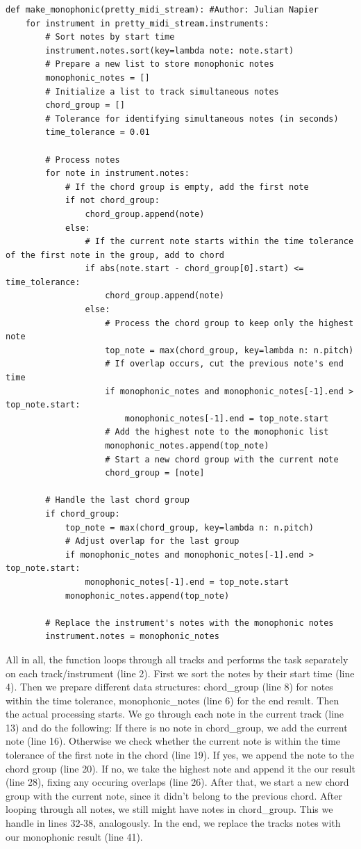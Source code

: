 \documentclass[a4paper,12pt]{extarticle}
\begin{document}
\begin{lstlisting}
def make_monophonic(pretty_midi_stream): #Author: Julian Napier
    for instrument in pretty_midi_stream.instruments:
        # Sort notes by start time
        instrument.notes.sort(key=lambda note: note.start)
        # Prepare a new list to store monophonic notes
        monophonic_notes = []
        # Initialize a list to track simultaneous notes
        chord_group = []
        # Tolerance for identifying simultaneous notes (in seconds)
        time_tolerance = 0.01

        # Process notes
        for note in instrument.notes:
            # If the chord group is empty, add the first note
            if not chord_group:
                chord_group.append(note)
            else:
                # If the current note starts within the time tolerance of the first note in the group, add to chord
                if abs(note.start - chord_group[0].start) <= time_tolerance:
                    chord_group.append(note)
                else:
                    # Process the chord group to keep only the highest note
                    top_note = max(chord_group, key=lambda n: n.pitch)
                    # If overlap occurs, cut the previous note's end time
                    if monophonic_notes and monophonic_notes[-1].end > top_note.start:
                        monophonic_notes[-1].end = top_note.start
                    # Add the highest note to the monophonic list
                    monophonic_notes.append(top_note)
                    # Start a new chord group with the current note
                    chord_group = [note]

        # Handle the last chord group
        if chord_group:
            top_note = max(chord_group, key=lambda n: n.pitch)
            # Adjust overlap for the last group
            if monophonic_notes and monophonic_notes[-1].end > top_note.start:
                monophonic_notes[-1].end = top_note.start
            monophonic_notes.append(top_note)

        # Replace the instrument's notes with the monophonic notes
        instrument.notes = monophonic_notes
\end{lstlisting}
All in all, the function loops through all tracks and performs the task separately on each track/instrument (line 2). First we sort the notes by their start time (line 4). Then we prepare different data structures: chord\_group (line 8) for notes within the time tolerance, monophonic\_notes (line 6) for the end result. Then the actual processing starts. We go through each note in the current track (line 13) and do the following: If there is no note in chord\_group, we add the current note (line 16). Otherwise we check whether the current note is within the time tolerance of the first note in the chord (line 19). If yes, we append the note to the chord group (line 20). If no, we take the highest note and append it the our result (line 28), fixing any occuring overlaps (line 26). After that, we start a new chord group with the current note, since it didn't belong to the previous chord. After looping through all notes, we still might have notes in chord\_group. This we handle in lines 32-38, analogously. In the end, we replace the tracks notes with our monophonic result (line 41).
\end{document}
